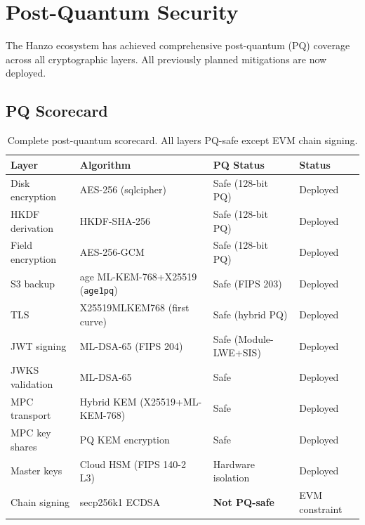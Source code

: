 \section{Post-Quantum Security}


The Hanzo ecosystem has achieved comprehensive post-quantum (PQ)
coverage across all cryptographic layers. All previously planned
mitigations are now deployed.

\subsection{PQ Scorecard}

\begin{table}[H]
\centering
\begin{tabular}{@{}llll@{}}
\toprule
\textbf{Layer} & \textbf{Algorithm} & \textbf{PQ Status} & \textbf{Status} \\
\midrule
Disk encryption     & AES-256 (sqlcipher)          & Safe (128-bit PQ)    & Deployed \\
HKDF derivation     & HKDF-SHA-256                 & Safe (128-bit PQ)    & Deployed \\
Field encryption    & AES-256-GCM                  & Safe (128-bit PQ)    & Deployed \\
S3 backup           & age ML-KEM-768+X25519 (\texttt{age1pq}) & Safe (FIPS 203) & Deployed \\
TLS                 & X25519MLKEM768 (first curve) & Safe (hybrid PQ)     & Deployed \\
JWT signing         & ML-DSA-65 (FIPS 204)         & Safe (Module-LWE+SIS)& Deployed \\
JWKS validation     & ML-DSA-65                    & Safe                 & Deployed \\
MPC transport       & Hybrid KEM (X25519+ML-KEM-768) & Safe              & Deployed \\
MPC key shares      & PQ KEM encryption            & Safe                 & Deployed \\
Master keys         & Cloud HSM (FIPS 140-2 L3)    & Hardware isolation   & Deployed \\
Chain signing       & secp256k1 ECDSA              & \textbf{Not PQ-safe} & EVM constraint \\
\bottomrule
\end{tabular}
\caption{Complete post-quantum scorecard. All layers PQ-safe except EVM chain signing.}
\label{tab:pq-scorecard}
\end{table}

